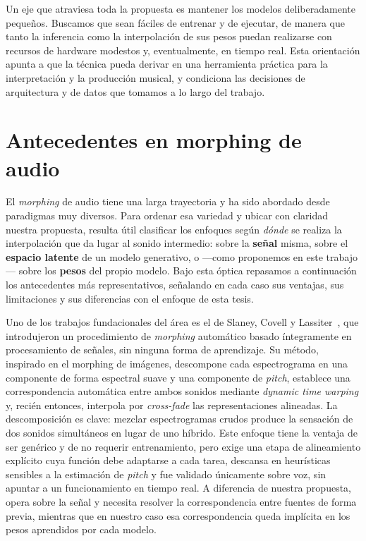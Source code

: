 \documentclass[12pt,a4paper,twoside]{tesis}
\begin{document}
Un eje que atraviesa toda la propuesta es mantener los modelos deliberadamente pequeños. Buscamos que sean fáciles de entrenar y de ejecutar, de manera que tanto la inferencia como la interpolación de sus pesos puedan realizarse con recursos de hardware modestos y, eventualmente, en tiempo real. Esta orientación apunta a que la técnica pueda derivar en una herramienta práctica para la interpretación y la producción musical, y condiciona las decisiones de arquitectura y de datos que tomamos a lo largo del trabajo.

\newpage
\section{Antecedentes en morphing de audio}

El \emph{morphing} de audio tiene una larga trayectoria y ha sido abordado desde paradigmas muy diversos. Para ordenar esa variedad y ubicar con claridad nuestra propuesta, resulta útil clasificar los enfoques según \emph{dónde} se realiza la interpolación que da lugar al sonido intermedio: sobre la \textbf{señal} misma, sobre el \textbf{espacio latente} de un modelo generativo, o —como proponemos en este trabajo— sobre los \textbf{pesos} del propio modelo. Bajo esta óptica repasamos a continuación los antecedentes más representativos, señalando en cada caso sus ventajas, sus limitaciones y sus diferencias con el enfoque de esta tesis.

Uno de los trabajos fundacionales del área es el de Slaney, Covell y Lassiter~\cite{slaney1996audiomorphing}, que introdujeron un procedimiento de \emph{morphing} automático basado íntegramente en procesamiento de señales, sin ninguna forma de aprendizaje. Su método, inspirado en el morphing de imágenes, descompone cada espectrograma en una componente de forma espectral suave y una componente de \textit{pitch}, establece una correspondencia automática entre ambos sonidos mediante \textit{dynamic time warping} y, recién entonces, interpola por \textit{cross-fade} las representaciones alineadas. La descomposición es clave: mezclar espectrogramas crudos produce la sensación de dos sonidos simultáneos en lugar de uno híbrido. Este enfoque tiene la ventaja de ser genérico y de no requerir entrenamiento, pero exige una etapa de alineamiento explícito cuya función debe adaptarse a cada tarea, descansa en heurísticas sensibles a la estimación de \textit{pitch} y fue validado únicamente sobre voz, sin apuntar a un funcionamiento en tiempo real. A diferencia de nuestra propuesta, opera sobre la señal y necesita resolver la correspondencia entre fuentes de forma previa, mientras que en nuestro caso esa correspondencia queda implícita en los pesos aprendidos por cada modelo.
\end{document}
